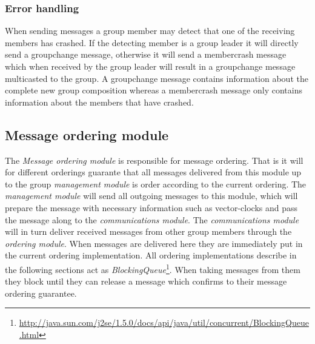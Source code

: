 \documentclass[titlepage, twocolumn, a4paper, 10pt]{article}
\begin{document}
\subsubsection{Error handling}\label{sec:error-handling}
When sending messages a group member may detect that one of the
receiving members has crashed. If the detecting member is a group
leader it will directly send a groupchange message, otherwise it will
send a membercrash message which when received by the group leader
will result in a groupchange message multicasted to the group. A
groupchange message contains information about the complete new group
composition whereas a membercrash message only contains information
about the members that have crashed.


\subsection{Message ordering module}\label{sec:message-ordering-module}
The \textit{Message ordering module} is responsible for message
ordering. That is it will for different orderings guarante that all
messages delivered from this module up to the group \textit{management
  module} is order according to the current ordering. The
\textit{management module} will send all outgoing messages to this
module, which will prepare the message with necessary information such
as vector-clocks and pass the message along to the
\textit{communications module}. The \textit{communications module}
will in turn deliver received messages from other group members
through the \textit{ordering module}. When messages are delivered here
they are immediately put in the current ordering implementation. All
ordering implementations describe in the following sections act as
\textit{BlockingQueue}\footnote{\url{http://java.sun.com/j2se/1.5.0/docs/api/java/util/concurrent/BlockingQueue.html}}.
When taking messages from them they block until they can release a
message which confirms to their message ordering guarantee.
\end{document}
